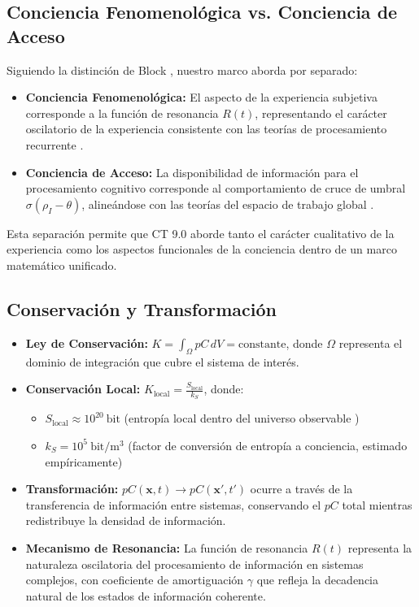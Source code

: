 \documentclass[12pt]{article}
\newcommand{\bit}{\text{bit}}
\begin{document}
\subsection{Conciencia Fenomenológica vs. Conciencia de Acceso}
Siguiendo la distinción de Block \cite{block2007}, nuestro marco aborda por separado:

\begin{itemize}
    \item \textbf{Conciencia Fenomenológica:} El aspecto de la experiencia subjetiva corresponde a la función de resonancia $R(t)$, representando el carácter oscilatorio de la experiencia consistente con las teorías de procesamiento recurrente \cite{lamme2006}.
    
    \item \textbf{Conciencia de Acceso:} La disponibilidad de información para el procesamiento cognitivo corresponde al comportamiento de cruce de umbral $\sigma(\rho_I - \theta)$, alineándose con las teorías del espacio de trabajo global \cite{dehaene2011}.
\end{itemize}

Esta separación permite que CT 9.0 aborde tanto el carácter cualitativo de la experiencia como los aspectos funcionales de la conciencia dentro de un marco matemático unificado.

\subsection{Conservación y Transformación}
\begin{itemize}
    \item \textbf{Ley de Conservación:} $K = \int_{\Omega} pC \, dV = \text{constante}$, donde $\Omega$ representa el dominio de integración que cubre el sistema de interés.
    
    \item \textbf{Conservación Local:} $K_{\text{local}} = \frac{S_{\text{local}}}{k_S}$, donde:
    \begin{itemize}[label=--]
        \item $S_{\text{local}} \approx 10^{20}~\bit$ (entropía local dentro del universo observable \cite{susskind1995})
        \item $k_S = 10^{5}~\bit/\text{m}^3$ (factor de conversión de entropía a conciencia, estimado empíricamente)
    \end{itemize}
    
    \item \textbf{Transformación:} $pC(\mathbf{x}, t) \rightarrow pC(\mathbf{x'}, t')$ ocurre a través de la transferencia de información entre sistemas, conservando el $pC$ total mientras redistribuye la densidad de información.
    
    \item \textbf{Mecanismo de Resonancia:} La función de resonancia $R(t)$ representa la naturaleza oscilatoria del procesamiento de información en sistemas complejos, con coeficiente de amortiguación $\gamma$ que refleja la decadencia natural de los estados de información coherente.
\end{itemize}
\end{document}
